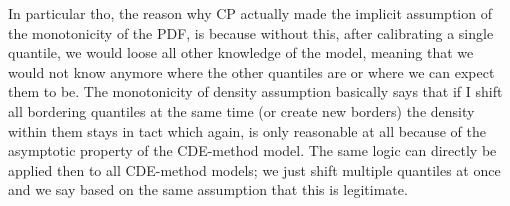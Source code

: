 
In particular tho, the reason why CP actually made the implicit assumption of the monotonicity of the PDF, is because without this, after calibrating a single quantile, we would loose all other knowledge of the model, meaning that we would not know anymore where the other quantiles are or where we can expect them to be. The monotonicity of density assumption basically says that if I shift all bordering quantiles at the same time (or create new borders) the density within them stays in tact which again, is only reasonable at all because of the asymptotic property of the CDE-method model. The same logic can directly be applied then to all CDE-method models; we just shift multiple quantiles at once and we say based on the same assumption that this is legitimate.

